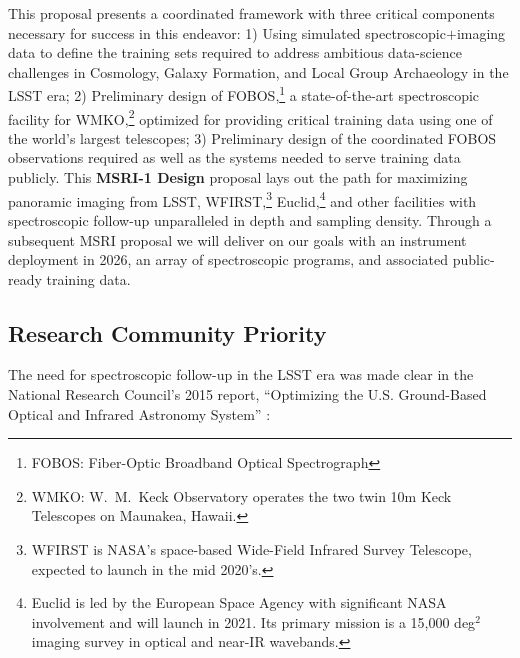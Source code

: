 \documentclass[oneside,11pt]{amsart}
\newcommand{\comment}[2][todo]{{\color{#1}[[{\bf #2}]]}}
\begin{document}
This proposal presents a coordinated framework with three critical
components necessary for success in this endeavor: 1) Using simulated
spectroscopic$+$imaging data to define the training sets required to
address ambitious data-science challenges in Cosmology, Galaxy
Formation, and Local Group Archaeology in the LSST era; 2) Preliminary
design of FOBOS,\footnote{FOBOS: Fiber-Optic Broadband Optical
Spectrograph} a state-of-the-art spectroscopic facility for
WMKO,\footnote{WMKO: W.~M.\ Keck Observatory operates the two twin 10m
Keck Telescopes on Maunakea, Hawaii.} optimized for providing critical
training data using one of the world's largest telescopes; 3)
Preliminary design of the coordinated FOBOS observations required as
well as the systems needed to serve training data publicly.  This {\bf
MSRI-1 Design} proposal lays out the path for maximizing panoramic
imaging from LSST, WFIRST,\footnote{WFIRST is NASA's space-based
Wide-Field Infrared Survey Telescope, expected to launch in the mid
2020's.} Euclid,\footnote{Euclid is led by the European Space Agency
with significant NASA involvement and will launch in 2021. Its primary
mission is a 15,000 deg$^2$ imaging survey in optical and near-IR
wavebands.} and other facilities with spectroscopic follow-up
unparalleled in depth and sampling density.  Through a subsequent MSRI
proposal we will deliver on our goals with an instrument deployment in
2026, an array of spectroscopic programs, and associated public-ready
training data.


\subsection{Research Community Priority} 
\label{sec:community}

The need for spectroscopic follow-up in the LSST era was made clear in
the National Research Council's 2015 report, ``Optimizing the U.S.
Ground-Based Optical and Infrared Astronomy System'' \citep{NAP21722}:
%
\noindent{}
\end{document}

